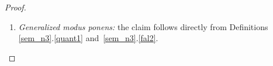 \begin{proof}
\begin{enumerate}
% 
\item \emph{Generalized modus ponens:} the claim follows directly from Definitions \ref{sem_n3}.\ref{quant1} %
and~\ref{sem_n3}.\ref{fal2}.
\end{enumerate}
\end{proof}



